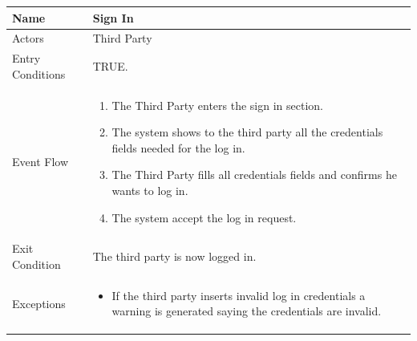\begin{enumerate}
\FloatBarrier
\begin{table}[h]
\begin{tabular}{|l|p{}|}
\hline
Name             & Sign In \\ \hline
Actors           & Third Party  \\ \hline
Entry Conditions & TRUE.    \\ \hline
Event Flow       & \begin{enumerate}
            \item The Third Party enters the sign in section.
            \item The system shows to the third party all the credentials fields needed for the log in.
            \item The Third Party fills all credentials fields and confirms he wants to log in.
            \item The system accept the log in request.
        \end{enumerate}\\ \hline
Exit Condition   & The third party is now logged in.\\ \hline
Exceptions       & \begin{itemize}
\item If the third party inserts invalid log in credentials a warning is generated saying the credentials are invalid.
\end{itemize}\\ \hline
\end{tabular}
\end{table}
\FloatBarrier


\end{enumerate}
